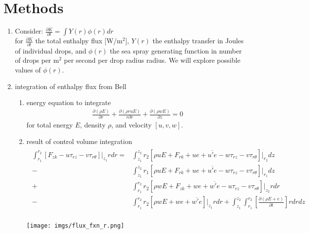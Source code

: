 \documentclass[10pt,a4paper]{article}
\begin{document}
\section{Methods}
\begin{enumerate}
\item Consider: $\frac{\partial K}{\partial t} = \int Y(r)\phi(r) dr\label{eq:Kdt}$\\
for $\frac{\partial K}{\partial t}$ the total enthalpy flux [W/m$^2$], $Y(r)$ the enthalpy transfer in Joules of individual drops, and $\phi(r)$ the sea spray generating function in number of drops per m$^2$ per second per drop radius radius.  We will explore possible values of $\phi(r)$.
\item integration of enthalpy flux from Bell
\begin{enumerate}
\item energy equation to integrate\\
\begin{align}
 \frac{\partial (\rho E)}{\partial r} + \frac{\partial (\rho r u E)}{r \partial r}+ \frac{\partial (\rho w E)}{\partial z}=0
\end{align}
for total energy $E$, density $\rho$, and velocity $[u,v,w]$.
\item result of control volume integration\\
\begin{align}
\begin{split}
\int_{r_1}^{r_2} [F_{zk}- u\tau_{rz} - v\tau_{r\theta}]\bigg\rvert_{z_1}rdr =& \int_{z_1}^{z_2} r_2[\rho u E + F_{rk} + ue + \overline{u'e} - w\tau_{rz} - v\tau_{r\theta}]\bigg\rvert_{r_2}dz\\
-& \int_{z_1}^{z_2} r_1[\rho u E + F_{rk} + ue + \overline{u'e} - w\tau_{rz} - v\tau_{r\theta}]\bigg\rvert_{r_1}dz\\
+& \int_{r_1}^{r_2} r_2[\rho w E + F_{zk} + we + \overline{w'e} - u\tau_{rz} - v\tau_{r\theta}]\bigg\rvert_{z_2}rdr\\
-& \int_{r_1}^{r_2} r_2[\rho w E + we + \overline{w'e} ]\bigg\rvert_{z_1}rdr + \int_{z_1}^{z_2}\int_{r_1}^{r_2}\left[\frac{\partial (\rho E + e)}{\partial t}\right]rdrdz\\\label{eq:NetEFlux}
\end{split}
\end{align}
\begin{center}
\hspace*{-1in}\texttt{[image: imgs/flux\_fxn\_r.png]}
\end{center}
\end{enumerate}

\end{enumerate}
\end{document}
